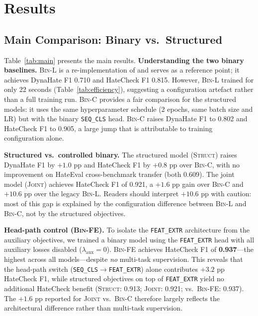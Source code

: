 \documentclass{article}
\begin{document}
\section{Results}
\label{sec:results}

\subsection{Main Comparison: Binary vs.\ Structured}

Table~\ref{tab:main} presents the main results.
\textbf{Understanding the two binary baselines.}
\textsc{Bin-L} is a re-implementation of \citet{sen2024hatetinyllm} and
serves as a reference point; it achieves DynaHate F1 0.710 and HateCheck F1
0.815.
However, \textsc{Bin-L} trained for only 22 seconds (Table~\ref{tab:efficiency}),
suggesting a configuration artefact rather than a full training run.
\textsc{Bin-C} provides a fair comparison for the structured models: it uses
the same hyperparameter schedule (2 epochs, same batch size and LR) but with
the binary \texttt{SEQ\_CLS} head.
\textsc{Bin-C} raises DynaHate F1 to 0.802 and HateCheck F1 to 0.905, a large
jump that is attributable to training configuration alone.

\textbf{Structured vs.\ controlled binary.}
The structured model (\textsc{Struct}) raises DynaHate F1 by $+1.0$ pp and
HateCheck F1 by $+0.8$ pp over \textsc{Bin-C}, with no improvement on HateEval
cross-benchmark transfer (both 0.609).
The joint model (\textsc{Joint}) achieves HateCheck F1 of 0.921,
a $+1.6$ pp gain over \textsc{Bin-C} and $+10.6$ pp over the legacy
\textsc{Bin-L}.
Readers should interpret $+10.6$ pp with caution: most of this gap is explained
by the configuration difference between \textsc{Bin-L} and \textsc{Bin-C}, not
by the structured objectives.

\textbf{Head-path control (\textsc{Bin-FE}).}
To isolate the \texttt{FEAT\_EXTR} architecture from the auxiliary objectives,
we trained a binary model using the \texttt{FEAT\_EXTR} head with all auxiliary
losses disabled ($\lambda_\text{aux}=0$).
\textsc{Bin-FE} achieves HateCheck F1 of \textbf{0.937}—the highest across all
models—despite \emph{no} multi-task supervision.
This reveals that the head-path switch (\texttt{SEQ\_CLS}$\to$\texttt{FEAT\_EXTR})
alone contributes $+3.2$ pp HateCheck F1, while structured objectives on top
of \texttt{FEAT\_EXTR} yield no additional HateCheck benefit
(\textsc{Struct}: 0.913; \textsc{Joint}: 0.921; vs.\ \textsc{Bin-FE}: 0.937).
The $+1.6$ pp reported for \textsc{Joint} vs.\ \textsc{Bin-C} therefore
largely reflects the architectural difference rather than multi-task supervision.
\end{document}
